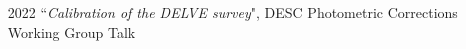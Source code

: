 \documentclass[11pt,letterpaper, sans]{moderncv}        %
\begin{document}
\begin{itemize}[itemsep=1pt, leftmargin=28pt]
    \item [2022] ``\textit{Calibration of the DELVE survey}", DESC Photometric Corrections Working Group \hfill Talk
\end{itemize}
\end{document}
